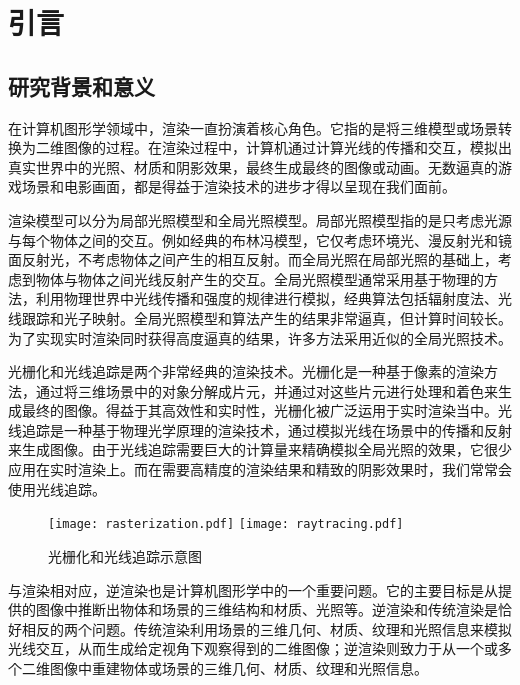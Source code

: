 
\chapter{引言}

\section{研究背景和意义}

在计算机图形学领域中，渲染一直扮演着核心角色。它指的是将三维模型或场景转换为二维图像的过程。在渲染过程中，计算机通过计算光线的传播和交互，模拟出真实世界中的光照、材质和阴影效果，最终生成最终的图像或动画。无数逼真的游戏场景和电影画面，都是得益于渲染技术的进步才得以呈现在我们面前。

渲染模型可以分为局部光照模型和全局光照模型。局部光照模型指的是只考虑光源与每个物体之间的交互。例如经典的布林冯模型，它仅考虑环境光、漫反射光和镜面反射光，不考虑物体之间产生的相互反射。而全局光照在局部光照的基础上，考虑到物体与物体之间光线反射产生的交互。全局光照模型通常采用基于物理的方法，利用物理世界中光线传播和强度的规律进行模拟，经典算法包括辐射度法、光线跟踪和光子映射。全局光照模型和算法产生的结果非常逼真，但计算时间较长。为了实现实时渲染同时获得高度逼真的结果，许多方法采用近似的全局光照技术。

光栅化和光线追踪是两个非常经典的渲染技术。光栅化是一种基于像素的渲染方法，通过将三维场景中的对象分解成片元，并通过对这些片元进行处理和着色来生成最终的图像。得益于其高效性和实时性，光栅化被广泛运用于实时渲染当中。光线追踪是一种基于物理光学原理的渲染技术，通过模拟光线在场景中的传播和反射来生成图像。由于光线追踪需要巨大的计算量来精确模拟全局光照的效果，它很少应用在实时渲染上。而在需要高精度的渲染结果和精致的阴影效果时，我们常常会使用光线追踪。

\begin{figure}[htbp]
  \centering
  \texttt{[image: rasterization.pdf]}
  \hspace{\fill}
  \texttt{[image: raytracing.pdf]}
  \caption{光栅化和光线追踪示意图}
  \label{fig:rasterization}
\end{figure}

与渲染相对应，逆渲染也是计算机图形学中的一个重要问题。它的主要目标是从提供的图像中推断出物体和场景的三维结构和材质、光照等。逆渲染和传统渲染是恰好相反的两个问题。传统渲染利用场景的三维几何、材质、纹理和光照信息来模拟光线交互，从而生成给定视角下观察得到的二维图像；逆渲染则致力于从一个或多个二维图像中重建物体或场景的三维几何、材质、纹理和光照信息。

